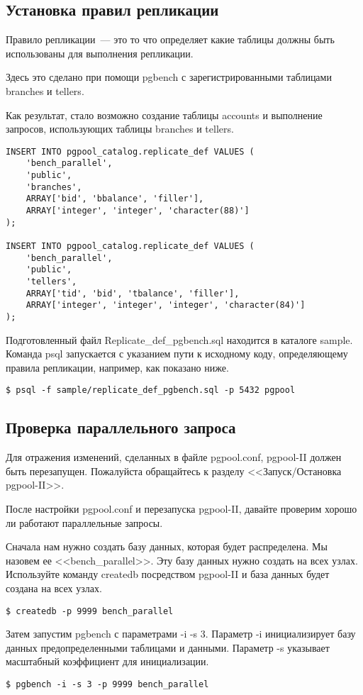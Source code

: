 \subsection{Установка правил репликации}
Правило репликации~--- это то что определяет какие таблицы должны быть использованы для выполнения репликации.

Здесь это сделано при помощи pgbench с зарегистрированными таблицами branches и tellers.

Как результат, стало возможно создание таблицы accounts и выполнение запросов, использующих таблицы branches и tellers.
\begin{verbatim}
INSERT INTO pgpool_catalog.replicate_def VALUES (
    'bench_parallel',
    'public',
    'branches',
    ARRAY['bid', 'bbalance', 'filler'],
    ARRAY['integer', 'integer', 'character(88)']
);

INSERT INTO pgpool_catalog.replicate_def VALUES (
    'bench_parallel',
    'public',
    'tellers',
    ARRAY['tid', 'bid', 'tbalance', 'filler'],
    ARRAY['integer', 'integer', 'integer', 'character(84)']
);
\end{verbatim}

Подготовленный файл Replicate\_def\_pgbench.sql находится в каталоге sample. Команда psql запускается с указанием пути к 
исходному коду, определяющему правила репликации, например, как показано ниже.
\begin{verbatim}
$ psql -f sample/replicate_def_pgbench.sql -p 5432 pgpool
\end{verbatim}

\subsection{Проверка параллельного запроса}
Для отражения изменений, сделанных в файле pgpool.conf, pgpool-II должен быть перезапущен. 
Пожалуйста обращайтесь к разделу <<Запуск/Остановка pgpool-II>>.

После настройки pgpool.conf и перезапуска pgpool-II, давайте проверим хорошо ли работают параллельные запросы.

Сначала нам нужно создать базу данных, которая будет распределена. Мы назовем ее <<bench\_parallel>>. 
Эту базу данных нужно создать на всех узлах. Используйте команду createdb посредством pgpool-II и база 
данных будет создана на всех узлах.
\begin{verbatim}
$ createdb -p 9999 bench_parallel
\end{verbatim}

Затем запустим pgbench с параметрами -i -s 3. Параметр -i инициализирует базу данных предопределенными 
таблицами и данными. Параметр -s указывает масштабный коэффициент для инициализации.
\begin{verbatim}
$ pgbench -i -s 3 -p 9999 bench_parallel
\end{verbatim}

